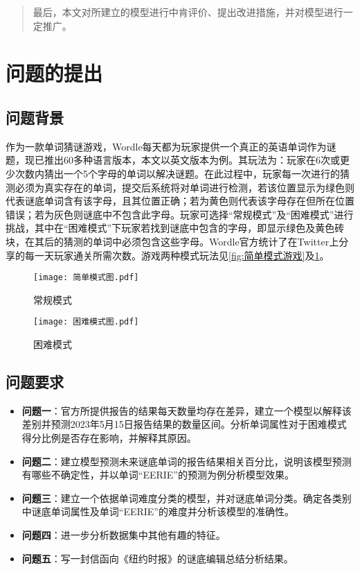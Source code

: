 \documentclass{MathModeling}
\begin{document}
\setcounter{page}{1}
\pagestyle{fancy}
	\begin{abstract}
		最后，本文对所建立的模型进行中肯评价、提出改进措施，并对模型进行一定推广。
	\end{abstract}

	\section{问题的提出}
	\subsection{问题背景}
	作为一款单词猜谜游戏，Wordle每天都为玩家提供一个真正的英语单词作为谜题，现已推出60多种语言版本，本文以英文版本为例。其玩法为：玩家在6次或更少次数内猜出一个5个字母的单词以解决谜题。在此过程中，玩家每一次进行的猜测必须为真实存在的单词，提交后系统将对单词进行检测，若该位置显示为绿色则代表谜底单词含有该字母，且其位置正确；若为黄色则代表该字母存在但所在位置错误；若为灰色则谜底中不包含此字母。玩家可选择“常规模式”及“困难模式”进行挑战，其中在“困难模式”下玩家若找到谜底中包含的字母，即显示绿色及黄色砖块，在其后的猜测的单词中必须包含这些字母。Wordle官方统计了在Twitter上分享的每一天玩家通关所需次数。游戏两种模式玩法见\textcolor{blue}{\cref{fig:简单模式游戏}}及\textcolor{blue}{\cref{fig:困难模式游戏}}。
	\begin{figure}[H]
		\centering
		\begin{minipage}{0.48\linewidth}
			\centering
			\texttt{[image: 简单模式图.pdf]}
			\caption{常规模式}
			\label{fig:简单模式游戏}
		\end{minipage}
		\begin{minipage}{0.48\linewidth}
			\centering
			\texttt{[image: 困难模式图.pdf]}
			\caption{困难模式}
			\label{fig:困难模式游戏}
		\end{minipage}
	\end{figure}

	\subsection{问题要求}
	\begin{itemize}
		\item \textbf{问题一}：官方所提供报告的结果每天数量均存在差异，建立一个模型以解释该差别并预测2023年5月15日报告结果的数量区间。分析单词属性对于困难模式得分比例是否存在影响，并解释其原因。
		\item \textbf{问题二}：建立模型预测未来谜底单词的报告结果相关百分比，说明该模型预测有哪些不确定性，并以单词“EERIE”的预测为例分析模型效果。
		\item \textbf{问题三}：建立一个依据单词难度分类的模型，并对谜底单词分类。确定各类别中谜底单词属性及单词“EERIE”的难度并分析该模型的准确性。
		\item \textbf{问题四}：进一步分析数据集中其他有趣的特征。
		\item \textbf{问题五}：写一封信函向《纽约时报》的谜底编辑总结分析结果。
	\end{itemize}
\end{document}
